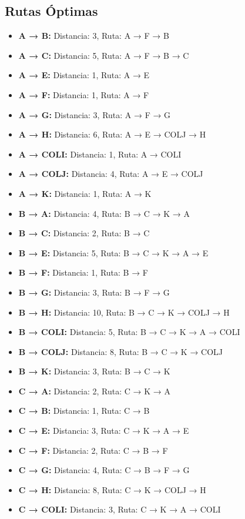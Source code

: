 \documentclass[12pt]{article}
\begin{document}
\subsection{Rutas Óptimas}
\begin{itemize}
\item \textbf{A → B:} Distancia: 3, Ruta: A → F → B
\item \textbf{A → C:} Distancia: 5, Ruta: A → F → B → C
\item \textbf{A → E:} Distancia: 1, Ruta: A → E
\item \textbf{A → F:} Distancia: 1, Ruta: A → F
\item \textbf{A → G:} Distancia: 3, Ruta: A → F → G
\item \textbf{A → H:} Distancia: 6, Ruta: A → E → COLJ → H
\item \textbf{A → COLI:} Distancia: 1, Ruta: A → COLI
\item \textbf{A → COLJ:} Distancia: 4, Ruta: A → E → COLJ
\item \textbf{A → K:} Distancia: 1, Ruta: A → K
\item \textbf{B → A:} Distancia: 4, Ruta: B → C → K → A
\item \textbf{B → C:} Distancia: 2, Ruta: B → C
\item \textbf{B → E:} Distancia: 5, Ruta: B → C → K → A → E
\item \textbf{B → F:} Distancia: 1, Ruta: B → F
\item \textbf{B → G:} Distancia: 3, Ruta: B → F → G
\item \textbf{B → H:} Distancia: 10, Ruta: B → C → K → COLJ → H
\item \textbf{B → COLI:} Distancia: 5, Ruta: B → C → K → A → COLI
\item \textbf{B → COLJ:} Distancia: 8, Ruta: B → C → K → COLJ
\item \textbf{B → K:} Distancia: 3, Ruta: B → C → K
\item \textbf{C → A:} Distancia: 2, Ruta: C → K → A
\item \textbf{C → B:} Distancia: 1, Ruta: C → B
\item \textbf{C → E:} Distancia: 3, Ruta: C → K → A → E
\item \textbf{C → F:} Distancia: 2, Ruta: C → B → F
\item \textbf{C → G:} Distancia: 4, Ruta: C → B → F → G
\item \textbf{C → H:} Distancia: 8, Ruta: C → K → COLJ → H
\item \textbf{C → COLI:} Distancia: 3, Ruta: C → K → A → COLI

\end{itemize}
\end{document}
